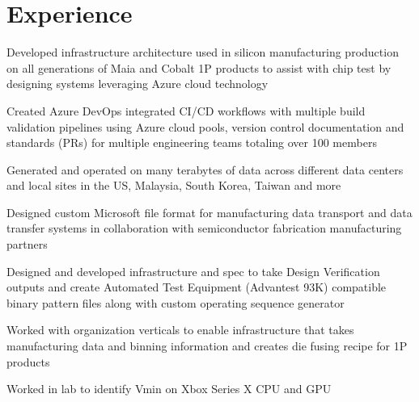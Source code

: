 \documentclass[letterpaper]{deedy-resume} %
\begin{document}
\begin{minipage}[t]{0.66\textwidth} %


\section{Experience}


\vspace{\topsep}

\begin{tightitemize}

\item Developed infrastructure architecture used in silicon manufacturing production on all generations of Maia and Cobalt 1P products to assist with chip test by designing systems leveraging Azure cloud technology
\item Created Azure DevOps integrated CI/CD workflows with multiple build validation pipelines using Azure cloud pools, version control documentation and standards (PRs) for multiple engineering teams totaling over 100 members
\item Generated and operated on many terabytes of data across different data centers and local sites in the US, Malaysia, South Korea, Taiwan and more
\item Designed custom Microsoft file format for manufacturing data transport and data transfer systems in collaboration with semiconductor fabrication manufacturing partners
\item Designed and developed infrastructure and spec to take Design Verification outputs and create Automated Test Equipment (Advantest 93K) compatible binary pattern files along with custom operating sequence generator
\item Worked with organization verticals to enable infrastructure that takes manufacturing data and binning information and creates die fusing recipe for 1P products
\item Worked in lab to identify Vmin on Xbox Series X CPU and GPU
\end{tightitemize}
\vspace{\topsep}



\end{minipage}
\end{document}
